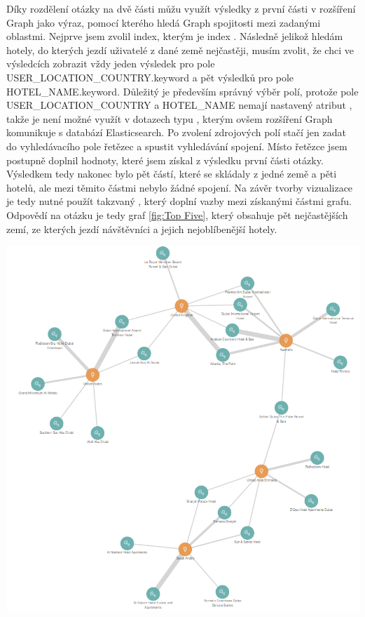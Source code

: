 \documentclass[czech,BP]{thesiskiv}
\begin{document}
\newpage
\noindent
Díky rozdělení otázky na dvě části můžu využít výsledky z první části v rozšíření Graph jako výraz, pomocí kterého hledá Graph spojitosti mezi zadanými oblastmi. Nejprve jsem zvolil index, kterým je index . Následně jelikož hledám hotely, do kterých jezdí uživatelé z dané země nejčastěji, musím zvolit, že chci ve výsledcích zobrazit vždy jeden výsledek pro pole USER\_LOCATION\_COUNTRY.keyword a pět výsledků pro pole HOTEL\_NAME.keyword. Důležitý je především správný výběr polí, protože pole USER\_LOCATION\_COUNTRY a HOTEL\_NAME nemají nastavený atribut , takže je není možné využít v dotazech typu , kterým ovšem rozšíření Graph komunikuje s databází Elasticsearch. Po zvolení zdrojových polí stačí jen zadat do vyhledávacího pole řetězec  a spustit vyhledávání spojení. Místo řetězce  jsem postupně doplnil hodnoty, které jsem získal z výsledku první části otázky. Výsledkem tedy nakonec bylo pět částí, které se skládaly z jedné země a pěti hotelů, ale mezi těmito částmi nebylo žádné spojení. Na závěr tvorby vizualizace je tedy nutné použít takzvaný , který doplní vazby mezi získanými částmi grafu. Odpovědí na otázku je tedy graf \ref{fig:Top Five}, který obsahuje pět nejčastějších zemí, ze kterých jezdí návštěvníci a jejich nejoblíbenější hotely.
\begin{center}
	\includegraphics[width = \textwidth]{img/5_countries_highest_appearance_graph.png}
\end{center}
\end{document}
